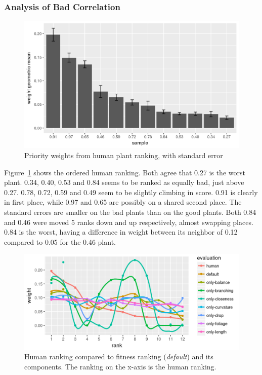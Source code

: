 
\subsubsection{Analysis of Bad Correlation}
\begin{figure}
    \centering
    \includegraphics[width=1.0\textwidth]{figures/weights_bar}
    \caption[Priority weights from human plant ranking]{Priority weights from human plant ranking, with standard error}
    \label{fig:weights-bar}
\end{figure}

Figure~\ref{fig:weights-bar} shows the ordered human ranking.
Both agree that 0.27 is the worst plant.
0.34, 0.40, 0.53 and 0.84 seems to be ranked as equally bad, just above 0.27.
0.78, 0.72, 0.59 and 0.49 seem to be slightly climbing in score.
0.91 is clearly in first place, while 0.97 and 0.65 are possibly on a shared second place.
The standard errors are smaller on the bad plants than on the good plants.
Both 0.84 and 0.46 were moved 5 ranks down and up respectively, almost swapping places.
0.84 is the worst, having a difference in weight between its neighbor of 0.12 compared to 0.05 for the 0.46 plant.

\begin{figure}
    \centering
    \includegraphics[width=1.0\textwidth]{figures/fitcmp-only}
    \caption[Human ranking compared to fitness ranking and its components]{Human ranking compared to fitness ranking (\textit{default}) and its components. The ranking on the x-axis is the human ranking.}
    \label{fig:fitcmp-only}
\end{figure}

